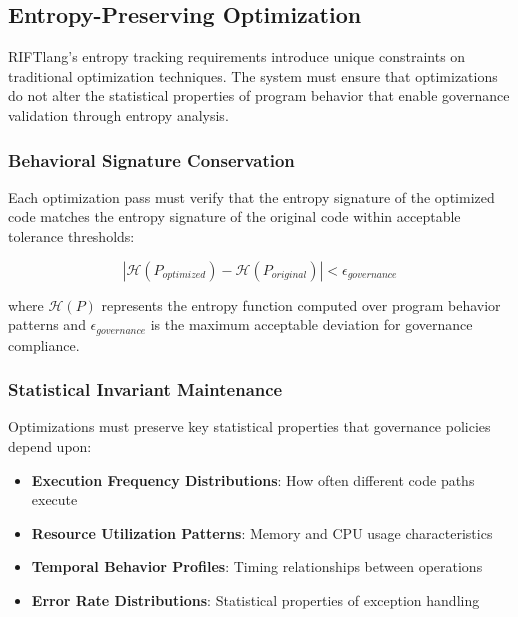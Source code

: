 \subsection{Entropy-Preserving Optimization}

RIFTlang's entropy tracking requirements introduce unique constraints on traditional optimization techniques. The system must ensure that optimizations do not alter the statistical properties of program behavior that enable governance validation through entropy analysis.

\subsubsection{Behavioral Signature Conservation}

Each optimization pass must verify that the entropy signature of the optimized code matches the entropy signature of the original code within acceptable tolerance thresholds:

\begin{equation}
|\mathcal{H}(P_{optimized}) - \mathcal{H}(P_{original})| < \epsilon_{governance}
\end{equation}

where $\mathcal{H}(P)$ represents the entropy function computed over program behavior patterns and $\epsilon_{governance}$ is the maximum acceptable deviation for governance compliance.

\subsubsection{Statistical Invariant Maintenance}

Optimizations must preserve key statistical properties that governance policies depend upon:

\begin{itemize}
\item \textbf{Execution Frequency Distributions}: How often different code paths execute
\item \textbf{Resource Utilization Patterns}: Memory and CPU usage characteristics
\item \textbf{Temporal Behavior Profiles}: Timing relationships between operations
\item \textbf{Error Rate Distributions}: Statistical properties of exception handling
\end{itemize}

